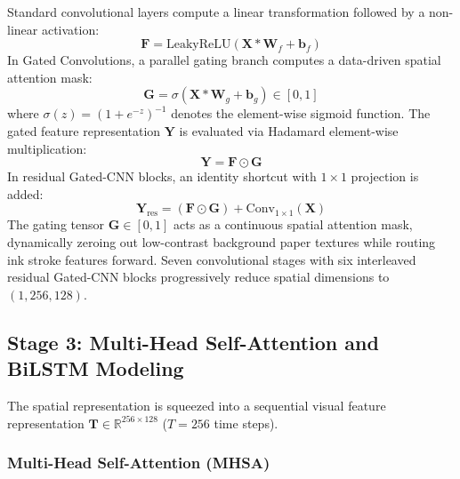 \documentclass{IEEEtran}
\begin{document}
Standard convolutional layers compute a linear transformation followed by a non-linear activation:
\begin{equation}
\mathbf{F} = \text{LeakyReLU}\left(\mathbf{X} * \mathbf{W}_f + \mathbf{b}_f\right)
\end{equation}
\noindent In Gated Convolutions, a parallel gating branch computes a data-driven spatial attention mask:
\begin{equation}
\mathbf{G} = \sigma\left(\mathbf{X} * \mathbf{W}_g + \mathbf{b}_g\right) \in [0, 1]
\end{equation}
where $\sigma(z) = (1 + e^{-z})^{-1}$ denotes the element-wise sigmoid function. The gated feature representation $\mathbf{Y}$ is evaluated via Hadamard element-wise multiplication:
\begin{equation}
\mathbf{Y} = \mathbf{F} \odot \mathbf{G}
\label{eq:gated_conv}
\end{equation}
\noindent In residual Gated-CNN blocks, an identity shortcut with $1 \times 1$ projection is added:
\begin{equation}
\mathbf{Y}_{\text{res}} = (\mathbf{F} \odot \mathbf{G}) + \text{Conv}_{1\times 1}(\mathbf{X})
\end{equation}
\noindent The gating tensor $\mathbf{G} \in [0, 1]$ acts as a continuous spatial attention mask, dynamically zeroing out low-contrast background paper textures while routing ink stroke features forward. Seven convolutional stages with six interleaved residual Gated-CNN blocks progressively reduce spatial dimensions to $(1, 256, 128)$.

\subsection{Stage 3: Multi-Head Self-Attention and BiLSTM Modeling}

The spatial representation is squeezed into a sequential visual feature representation $\mathbf{T} \in \mathbb{R}^{256 \times 128}$ ($T=256$ time steps).

\subsubsection{Multi-Head Self-Attention (MHSA)}
\end{document}
